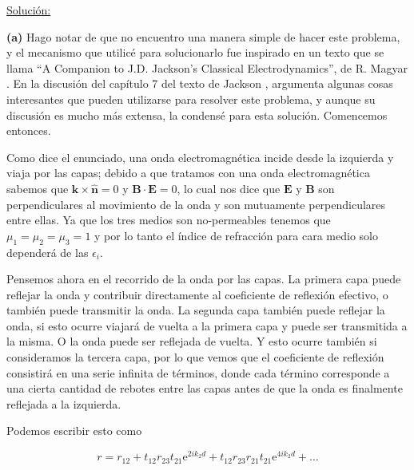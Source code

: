 \documentclass[a4paper,11pt]{article}
\numberwithin{equation}{section}
\newcommand{\euler}{\mathrm{e}}
\begin{document}
\vspace{.3cm}

\underline{Solución:} \vspace{.3cm}

\textbf{(a)} Hago notar de que no encuentro una manera simple de hacer este problema, y el mecanismo 
que utilicé para solucionarlo fue inspirado en un texto que se llama ``A Companion 
to J.D. Jackson's Classical Electrodynamics'', de R. Magyar \cite{magyar}. En la 
discusión del capítulo 7 del texto de Jackson \cite{jackson}, argumenta algunas cosas interesantes que 
pueden utilizarse para resolver este problema, y aunque su discusión es mucho más 
extensa, la condensé para esta solución. Comencemos entonces.

\vspace{.3cm}

Como dice el enunciado, una onda electromagnética incide desde la izquierda y viaja 
por las capas; debido a que tratamos con una onda electromagnética sabemos que 
$\mathbf{k} \times \hat{\mathbf{n}} = 0$ y $\mathbf{B} \cdot \mathbf{E} = 0$, lo 
cual nos dice que $\mathbf{E}$ y $\mathbf{B}$ son perpendiculares al movimiento 
de la onda y son mutuamente perpendiculares entre ellas. Ya que los tres medios 
son no-permeables tenemos que $\mu_1 = \mu_2 = \mu_3 = 1$ y por lo tanto el 
índice de refracción para cara medio solo dependerá de las $\epsilon_i$. 

\vspace{.3cm}

Pensemos ahora en el recorrido de la onda por las capas. La primera capa puede reflejar 
la onda y contribuir directamente al coeficiente de reflexión efectivo, o también 
puede transmitir la onda. La segunda capa también puede reflejar la onda, si esto 
ocurre viajará de vuelta a la primera capa y puede ser transmitida a la misma. O 
la onda puede ser reflejada de vuelta. Y esto ocurre también si consideramos la 
tercera capa, por lo que vemos que el coeficiente de reflexión consistirá en una 
serie infinita de términos, donde cada término corresponde a una cierta cantidad 
de rebotes entre las capas antes de que la onda es finalmente reflejada a la 
izquierda. 

\vspace{.3cm}

Podemos escribir esto como 

\begin{equation}
r = r_{12} + t_{12}r_{23}t_{21} \euler^{2ik_2d} + t_{12}r_{23}r_{21}t_{21}
\euler^{4ik_2d} + \dots
\label{eq:reflex1}
\end{equation}
\end{document}
